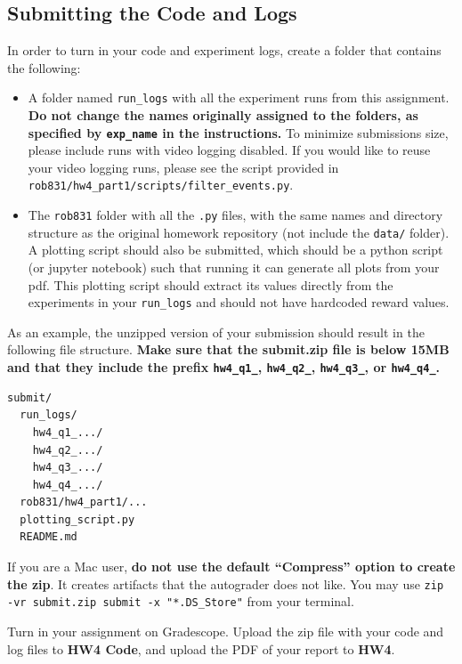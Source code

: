 \documentclass{article} %
\begin{document}
\subsection{Submitting the Code and Logs}
In order to turn in your code and experiment logs, create a folder that contains the following:
\begin{itemize}
    \item A folder named \texttt{run\_logs} with all the experiment runs from this assignment.
    \textbf{Do not change the names originally assigned to the folders, as specified by \texttt{exp\_name} in the instructions.}
    To minimize submissions size, please include runs with video logging disabled. If you would like to reuse your video logging runs, please see the script provided in \verb+rob831/hw4_part1/scripts/filter_events.py+.
    \item The \texttt{rob831} folder with all the \texttt{.py} files, with the same names and directory structure as the original homework repository (not include the \texttt{data/} folder). A plotting script should also be submitted, which should be a python script (or jupyter notebook) such that running it can generate all plots from your pdf. This plotting script should extract its values directly from the experiments in your \texttt{run\_logs} and should not have hardcoded reward values.
\end{itemize}

As an example, the unzipped version of your submission should result in the following file structure. \textbf{Make sure that the submit.zip file is below 15MB and that they include the prefix \texttt{hw4\_q1\_}, \texttt{hw4\_q2\_}, \texttt{hw4\_q3\_}, or \texttt{hw4\_q4\_}.}

\begin{verbatim}
submit/
  run_logs/
    hw4_q1_.../
    hw4_q2_.../
    hw4_q3_.../
    hw4_q4_.../
  rob831/hw4_part1/...
  plotting_script.py
  README.md
\end{verbatim}


If you are a Mac user, \textbf{do not use the default ``Compress'' option to create the zip}. It creates artifacts that the autograder does not like. You may use \texttt{zip -vr submit.zip submit -x "*.DS\_Store"} from your terminal.


Turn in your assignment on Gradescope. Upload the zip file with your code and log files to \textbf{HW4 Code}, and upload the PDF of your report to \textbf{HW4}.
\end{document}
